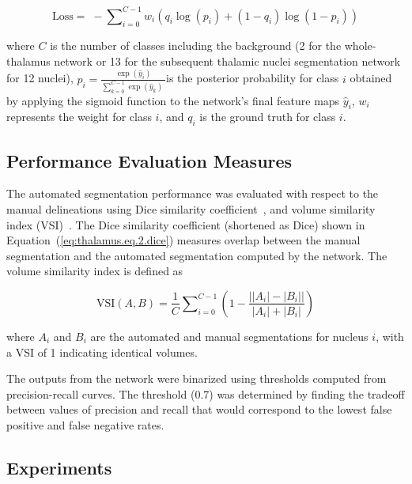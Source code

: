 \begin{equation}
\label{eq:thalamus.eq.3.loss}
\text{Loss} = \;-\sum\nolimits_{i=0}^{C-1}w_i\left(q_i \log(p_i)+(1-q_i)\log(1-p_i)\right)
\end{equation}

where $C $ is the number of classes including the background (2 for the whole-thalamus network or 13 for the subsequent thalamic nuclei segmentation network for 12 nuclei), $p_i=\frac{\exp{({\widehat y}_i)}}{\sum_{k=0}^{C-1}\exp{({\widehat y}_k)}\;} $is the posterior probability for class $i $ obtained by applying the sigmoid function to the network's final feature maps ${\widehat y}_i $, $w_i $ represents the weight for class $i $, and $q_i $ is the ground truth for class $i $.

\subsection{Performance Evaluation Measures}
The automated segmentation performance was evaluated with respect to the manual delineations using Dice similarity coefficient~\cite{dice_Measures_1945}, and volume similarity index (VSI)~\cite{su_Thalamus_2019}. The Dice similarity coefficient (shortened as Dice) shown in Equation~(\ref{eq:thalamus.eq.2.dice})  measures overlap between the manual segmentation and the automated segmentation computed by the network. The volume similarity index is defined as

\begin{equation}
\label{eq:thalamus.eq.4.vsi}
\text{VSI}(A,B) = \frac1C\sum\nolimits_{i=0}^{C-1}\left(1-\frac{\left\vert \left\vert A_i\right\vert-\left\vert B_i\right\vert\right\vert}{\left\vert A_i\right\vert+\left\vert B_i\right\vert}\right)
\end{equation}

where $A_i $ and $B_i $ are the automated and manual segmentations for nucleus $i $, with a VSI of 1 indicating identical volumes.

The outputs from the network were binarized using thresholds computed from precision-recall curves. The threshold (0.7) was determined by finding the tradeoff between values of precision and recall that would correspond to the lowest false positive and false negative rates.

\subsection{Experiments}


